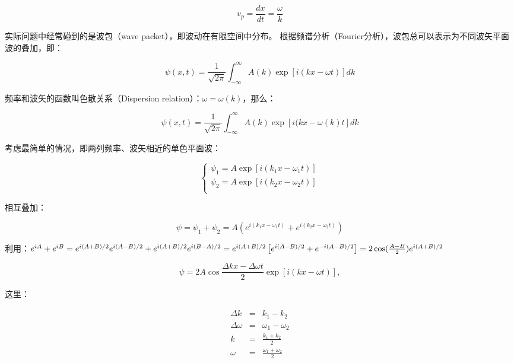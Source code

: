 \begin{equation}
v_p  = \frac{{dx}}{{dt}} = \frac{\omega }{k}
\end{equation}

实际问题中经常碰到的是波包（wave packet），即波动在有限空间中分布。
根据频谱分析（Fourier分析），波包总可以表示为不同波矢平面波的叠加，即：

\begin{equation}
\psi (x,t) = \frac{1}{{\sqrt {2\pi } }}\int_{ - \infty }^\infty  {A (k)\exp \left[ {i(kx - \omega t)} \right]dk} 
\end{equation}

频率和波矢的函数叫色散关系（Dispersion relation）：$\omega  = \omega (k)$，那么：

\begin{equation}
\psi (x,t) = \frac{1}{{\sqrt {2\pi } }}\int_{ - \infty }^\infty  {A (k)\exp \left[ {i(kx - \omega (k)t} \right]dk} 
\end{equation}

考虑最简单的情况，即两列频率、波矢相近的单色平面波：

\begin{equation}
\left\{ \begin{array}{l}
 \psi _1  = A\exp \left[ {i(k_1 x - \omega _1 t)} \right] \\
 \psi _2  = A\exp \left[ {i(k_2 x - \omega _2 t)} \right] \\
 \end{array} \right.
\end{equation}

相互叠加：

\begin{equation*}
\psi  = \psi _1  + \psi _2  = A \left( e^{i(k_1 x - \omega _1 t)} + e^{i(k_2 x - \omega _2 t)} \right)
\end{equation*}

利用：$e^{iA}  + e^{iB}  = e^{i(A + B)/2} e^{i(A - B)/2}  + e^{i(A + B)/2} e^{i(B - A)/2} \\ = e^{i(A + B)/2} \left[ {e^{i(A - B)/2}  + e^{ - i(A - B)/2} } \right] = 2\cos ({\textstyle{{A - B} \over 2}})e^{i(A + B)/2} $

\begin{equation}
\psi  = 2A\cos \frac{{\Delta kx - \Delta \omega t}}{2}\exp \left[ {i\left( {kx - \omega t} \right)} \right],
\end{equation}

这里：

\begin{eqnarray*}
\Delta k &=& k_1  - k_2 \\
\Delta \omega &=& \omega _1  - \omega _2 \\
k &=& \frac{{k_1  + k_2 }}{2} \\
\omega &=& \frac{{\omega {}_1 + \omega _2 }}{2}
\end{eqnarray*}


